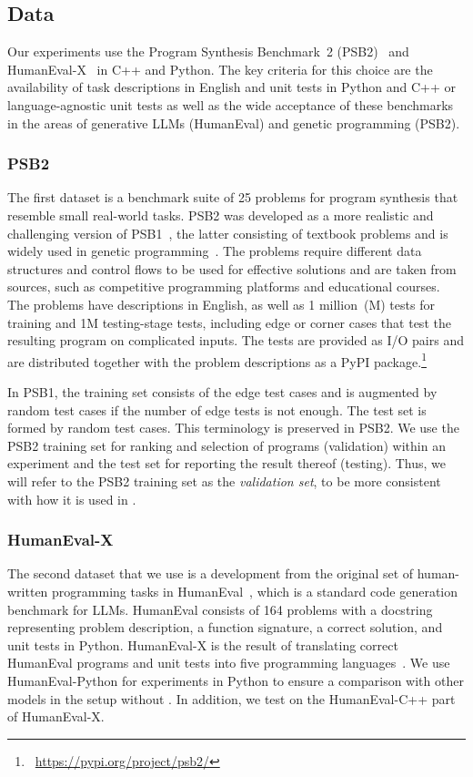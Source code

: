 \subsection{Data}
\label{sec:data}

Our experiments use the Program Synthesis Benchmark~2 (PSB2)~\cite{helmuth2022:applying} and HumanEval-X~\cite{zheng2023:codegeex} in C++ and Python. 
The key criteria for this choice are the availability of task descriptions in English and unit tests in Python and C++ or language-agnostic unit tests as well as the wide acceptance of these benchmarks in the areas of generative LLMs (HumanEval) and genetic programming (PSB2). 

\subsubsection{PSB2}
The first dataset is a benchmark suite of 25 problems for program synthesis that resemble small real-world tasks. PSB2 was developed as a more realistic and challenging version of PSB1~\cite{helmuth2015:general}, the latter consisting of textbook problems and is widely used in genetic programming~\cite{sobania2022:choose}. 
The problems require different data structures and control flows to be used for effective solutions and are taken from sources, such as competitive programming platforms and educational courses. 
The problems have descriptions in English, as well as 1 million~(M) tests for training and 1M testing-stage tests, including edge or corner cases that test the resulting program on complicated inputs. 
The tests are provided as I/O pairs and are distributed together with the problem descriptions as a PyPI package.\footnote{~\url{https://pypi.org/project/psb2/}} 

In PSB1, the training set consists of the edge test cases and is augmented by random test cases if the number of edge tests is not enough. The test set is formed by random test cases. 
This terminology is preserved in PSB2.
We use the PSB2 training set for ranking and selection of programs (validation) within an experiment and the test set for reporting the result thereof (testing).
Thus, we will refer to the PSB2 training set as the \emph{validation set}, to be more consistent with how it is used in \method{}.

\subsubsection{HumanEval-X}
The second dataset that we use is a development from the original set of human-written programming tasks in HumanEval~\cite{chen2021:evaluating}, which is a standard code generation benchmark for LLMs.
HumanEval consists of 164 problems with a docstring representing problem description, a function signature, a correct solution, and unit tests in Python. 
HumanEval-X is the result of translating correct HumanEval programs and unit tests into five programming languages~\cite{zheng2023:codegeex}. 
We use HumanEval-Python for experiments in Python to ensure a comparison with other models in the setup without \method{}. 
In addition, we test \method{} on the HumanEval-C++ part of HumanEval-X. %

